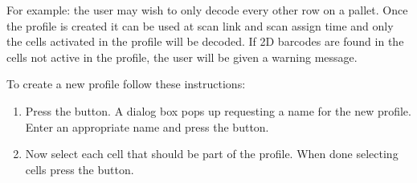 For example: the user may wish to only decode every other row on a pallet. Once
the profile is created it can be used at scan link and scan assign time and
only the cells activated in the profile will be decoded. If 2D barcodes are
found in the cells not active in the profile, the user will be given a warning
message.

To create a new profile follow these instructions:
\begin{enumerate}
  \item Press the  button. A dialog box pops up requesting a name
    for the new profile. Enter an appropriate name and press the 
    button.
  \item Now select each cell that should be part of the profile. When done
    selecting cells press the  button.
\end{enumerate}

